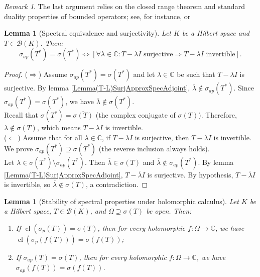\documentclass[a4paper,11pt]{article}
\theoremstyle{plain}
\newtheorem{lemma}[theorem]{Lemma}
\theoremstyle{definition}
\theoremstyle{remark}
\newtheorem{remark}[theorem]{Remark}
\DeclareMathOperator{\cl}{cl}
\begin{document}
\begin{remark}
The last argument relies on the closed range theorem and standard duality
properties of bounded operators; see, for instance, \cite[Chapter~IV]{Conway1990}
or \cite[Chapter~V]{DunfordSchwartz1958}
\end{remark}

\begin{lemma}[Spectral equivalence and surjectivity]
\label{LemmaApproxSpecEqualSpec}
Let $K$ be a Hilbert space and $T \in \mathcal{B}(K)$. Then:
\[\sigma_{ap}(T^*) = \sigma(T^*) \Leftrightarrow \left[\forall \lambda \in \mathbb{C} : T - \lambda I \text{ surjective} \Rightarrow T - \lambda I \text{ invertible}\right].\]
\end{lemma}

\begin{proof}
($\Rightarrow$) Assume $\sigma_{ap}(T^*) = \sigma(T^*)$ and let $\lambda \in \mathbb{C}$ be such that $T - \lambda I$ is surjective. By lemma \ref{Lemma(T-L)SurjApproxSpecAdjoint}, $\overline{\lambda} \notin \sigma_{ap}(T^*)$. Since $\sigma_{ap}(T^*) = \sigma(T^*)$, we have $\overline{\lambda} \notin \sigma(T^*)$. \\
Recall that $\sigma(T^*) = \overline{\sigma(T)}$ (the complex conjugate of $\sigma(T)$). Therefore, $\lambda \notin \sigma(T)$, which means $T - \lambda I$ is invertible. \\
($\Leftarrow$) Assume that for all $\lambda \in \mathbb{C}$, if $T - \lambda I$ is surjective, then $T - \lambda I$ is invertible. We prove $\sigma_{ap}(T^*) \supseteq \sigma(T^*)$ (the reverse inclusion always holds). \\
Let $\lambda \in \sigma(T^*) \setminus \sigma_{ap}(T^*)$. Then $\overline{\lambda} \in \sigma(T)$ and $\overline{\lambda} \notin \sigma_{ap}(T^*)$. By lemma \ref{Lemma(T-L)SurjApproxSpecAdjoint}, $T - \overline{\lambda}I$ is surjective. By hypothesis, $T - \overline{\lambda}I$ is invertible, so $\overline{\lambda} \notin \sigma(T)$, a contradiction.
\end{proof}

\begin{lemma}[Stability of spectral properties under holomorphic calculus]
\label{LemmaSpectrumFunctionOperator}
Let $K$ be a Hilbert space, $T \in \mathcal{B}(K)$, and $\Omega \supseteq \sigma(T)$ be open. Then:
\begin{enumerate}[label=(\roman*)]
\item If $\cl(\sigma_p(T)) = \sigma(T)$, then for every holomorphic $f: \Omega \to \mathbb{C}$, we have $\cl(\sigma_p(f(T))) = \sigma(f(T))$;
\item If $\sigma_{ap}(T) = \sigma(T)$, then for every holomorphic $f: \Omega \to \mathbb{C}$, we have $\sigma_{ap}(f(T)) = \sigma(f(T))$.
\end{enumerate}
\end{lemma}
\end{document}
